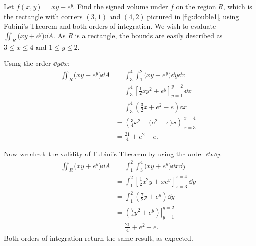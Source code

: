 
\begin{example}\label{ex_double1}
Let $f(x,y) = xy+e^y$. Find the signed volume under $f$ on the region $R$, which is the rectangle with corners $(3,1)$ and $(4,2)$ pictured in \autoref{fig:double1}, using Fubini's Theorem and both orders of integration.
\solution
We wish to evaluate $\iint_R \bigl(xy+e^y\bigr)\dd A$. As $R$ is a rectangle, the bounds are easily described as $3\leq x\leq 4$ and $1\leq y\leq 2$.\bigskip


Using the order $\dd y\dd x$:
\begin{align*}
\iint_R\bigl(xy+e^y\bigr) \dd A
	&= \int_3^4\int_1^2\bigl(xy+e^y\bigr)\dd y \dd x \\
	&= \int_3^4 \left[\frac12xy^2+e^y\right]_{y=1}^{y=2}\ \dd x \\
	&= \int_3^4\left(\frac 32x + e^2-e\right)\dd x \\
	&= \left.\left(\frac 34x^2 + \bigl(e^2-e\bigr)x\right)\right|_{x=3}^{x=4} \\
	&= \frac {21}4+ e^2-e%
	.
\end{align*}

Now we check the validity of Fubini's Theorem by using the order $\dd x\dd y$:
\allowdisplaybreaks
\begin{align*}
\iint_R\bigl(xy+e^y\bigr) \dd A &= \int_1^2\int_3^4\bigl(xy+e^y\bigr)\dd x \dd y \\
		&= \int_1^2\left[\frac12x^2y+xe^y\right]_{x=3}^{x=4}\ \dd y\\
		&= \int_1^2\left(\frac72y+e^y\right)\dd y\\
		&= \left.\left(\frac74y^2+e^y\right)\right|_{y=1}^{y=2}\\
		&=\frac{21}4+e^2-e%
		.
\end{align*}
Both orders of integration return the same result, as expected.
\end{example}

